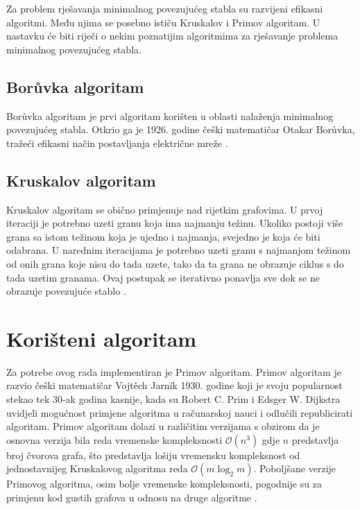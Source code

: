 \documentclass[conference]{IEEEtran}
\begin{document}
Za problem rješavanja minimalnog povezujućeg stabla su razvijeni efikasni algoritmi. Među njima se posebno ističu Kruskalov i Primov algoritam. U nastavku će biti riječi o nekim poznatijim algoritmima za rješavanje problema minimalnog povezujućeg stabla.

\subsection{Borůvka algoritam}
Borůvka algoritam je prvi algoritam korišten u oblasti nalaženja minimalnog povezujućeg stabla.  Otkrio ga je 1926. godine češki matematičar Otakar Borůvka, tražeći efikasni način postavljanja električne mreže \cite{b3}.


\subsection{Kruskalov algoritam}
Kruskalov algoritam se obično primjenuje nad rijetkim grafovima. U prvoj iteraciji je potrebno uzeti granu koja ima najmanju težinu. Ukoliko postoji više grana sa istom težinom koja je ujedno i najmanja, svejedno je koja će biti odabrana. U narednim iteracijama je potrebno uzeti granu s najmanjom težinom od onih grana koje nisu do tada uzete, tako da ta grana ne obrazuje ciklus s do tada uzetim granama. Ovaj postupak se iterativno ponavlja sve dok se ne obrazuje povezujuće stablo \cite{b4}. 




\section{Korišteni algoritam}
Za potrebe ovog rada implementiran je Primov algoritam. Primov algoritam je razvio češki matematičar Vojtěch Jarník 1930. godine koji je svoju popularnost stekao tek 30-ak godina kasnije, kada su Robert C. Prim i Edsger W. Dijkstra uvidjeli mogućnost primjene algoritma u računarskoj nauci i odlučili republicirati algoritam. Primov algoritam dolazi u različitim verzijama s obzirom da je osnovna verzija bila reda vremenske kompleksnosti $\mathcal{O}(n^3)$  gdje $n$ predstavlja broj čvorova grafa, što predstavlja lošiju vremensku kompleksnost od jednostavnijeg Kruskalovog algoritma reda $\mathcal{O}(m\log_2 m)$. Poboljšane verzije Primovog algoritma, osim bolje vremenske kompleksnosti, pogodnije su za primjenu kod gustih grafova u odnosu na druge algoritme \cite{b2}.
\end{document}
